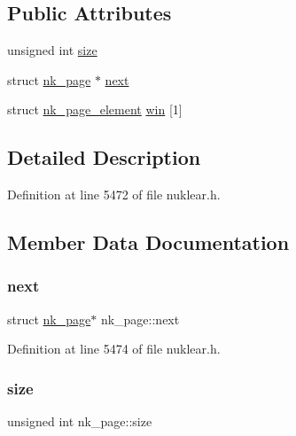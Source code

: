 \subsection*{Public Attributes}
\begin{DoxyCompactItemize}
\item 
unsigned int \mbox{\hyperlink{structnk__page_ac50d0195abe080870f0ea10e87fbd2b2}{size}}
\item 
struct \mbox{\hyperlink{structnk__page}{nk\+\_\+page}} $\ast$ \mbox{\hyperlink{structnk__page_a1e5da2e0cd34e3a43361c8dbc3387a1e}{next}}
\item 
struct \mbox{\hyperlink{structnk__page__element}{nk\+\_\+page\+\_\+element}} \mbox{\hyperlink{structnk__page_a217456877442e5b9a21be2042d50cb1b}{win}} \mbox{[}1\mbox{]}
\end{DoxyCompactItemize}


\subsection{Detailed Description}


Definition at line 5472 of file nuklear.\+h.



\subsection{Member Data Documentation}
\mbox{\label{structnk__page_a1e5da2e0cd34e3a43361c8dbc3387a1e}} 
\subsubsection{\texorpdfstring{next}{next}}
{\footnotesize\ttfamily struct \mbox{\hyperlink{structnk__page}{nk\+\_\+page}}$\ast$ nk\+\_\+page\+::next}



Definition at line 5474 of file nuklear.\+h.

\mbox{\label{structnk__page_ac50d0195abe080870f0ea10e87fbd2b2}} 
\subsubsection{\texorpdfstring{size}{size}}
{\footnotesize\ttfamily unsigned int nk\+\_\+page\+::size}




